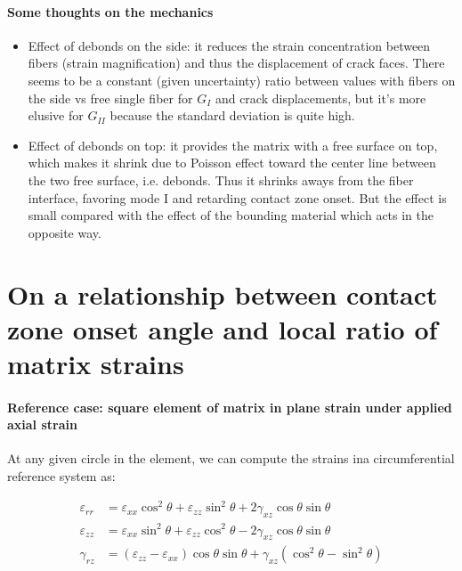 \documentclass[review]{elsarticle}
\begin{document}
\paragraph{Some thoughts on the mechanics}
\begin{itemize}
\item Effect of debonds on the side: it reduces the strain concentration between fibers (strain magnification) and thus the displacement of crack faces. There seems to be a constant (given uncertainty) ratio between values with fibers on the side vs free single fiber for $G_{I}$ and crack displacements, but it's more elusive for $G_{II}$ because the standard deviation is quite high.
\item Effect of debonds on top: it provides the matrix with a free surface on top, which makes it shrink due to Poisson effect toward the center line between the two free surface, i.e. debonds. Thus it shrinks aways from the fiber interface, favoring mode I and retarding contact zone onset. But the effect is small compared with the effect of the bounding material which acts in the opposite way.
\end{itemize}

\section{On a relationship between contact zone onset angle and local ratio of matrix strains}

\paragraph{Reference case: square element of matrix in plane strain under applied axial strain}
At any given circle in the element, we can compute the strains ina circumferential reference system as:

\begin{equation}
\begin{split}
\varepsilon_{rr}&=\varepsilon_{xx}\cos^{2}{\theta}+\varepsilon_{zz}\sin^{2}{\theta}+2\gamma_{xz}\cos{\theta}\sin{\theta}\\
\varepsilon_{zz}&=\varepsilon_{xx}\sin^{2}{\theta}+\varepsilon_{zz}\cos^{2}{\theta}-2\gamma_{xz}\cos{\theta}\sin{\theta}\\
\gamma_{rz}&=\left(\varepsilon_{zz}-\varepsilon_{xx}\right)\cos{\theta}\sin{\theta}+\gamma_{xz}\left(\cos^{2}{\theta}-\sin^{2}{\theta}\right)
\end{split}
\end{equation}
\end{document}
